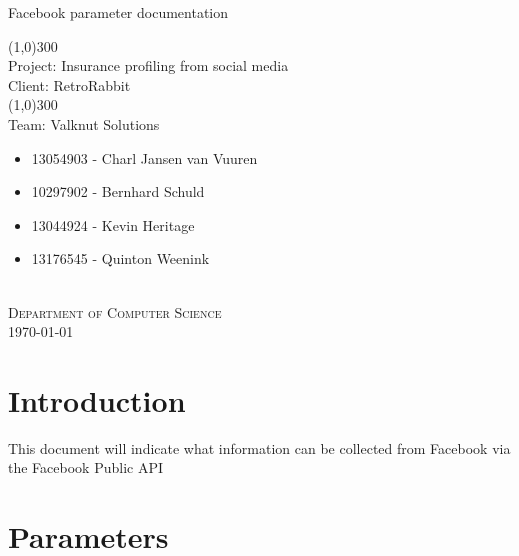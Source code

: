 \documentclass{article}
\begin{document}
	\begin{titlepage}
		\begin{center}
			\huge{
			Facebook parameter documentation\\
			}
			
			\line(1,0){300}\\
			[0.2cm]
			\LARGE{Project: Insurance profiling from social media\\
			Client: RetroRabbit} \\
			\line(1,0){300}\\
			\LARGE{Team: Valknut Solutions}\\
			[1.0cm]
			\large
			{
			\begin{itemize}
				\item 13054903 - Charl Jansen van Vuuren 
				\item 10297902 - Bernhard Schuld      
				\item 13044924 - Kevin Heritage
				\item 13176545 - Quinton Weenink\\
			\end{itemize}
			}
			\textsc{\large}\\
		[3.0cm]
		\textsc{\large  Department of Computer Science}\\
		[0.5cm]
		\textsc{\large \today}\\
		\end{center}

	\end{titlepage}
	\cleardoublepage
	\tableofcontents
\section{Introduction}
This document will indicate what information can be collected from Facebook via the Facebook Public API
\section{Parameters}
\end{document}
